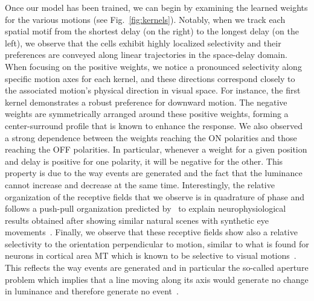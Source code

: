 \documentclass[default]{sn-jnl}%
\theoremstyle{thmstyleone}%
\theoremstyle{thmstyletwo}%
\theoremstyle{thmstylethree}%
\newcommand{\seeFig}[1]{see Fig.~\ref{fig:#1}}%
\begin{document}
%
%
Once our model has been trained, we can begin by examining the learned weights for the various motions (\seeFig{kernels}). Notably, when we track each spatial motif from the shortest delay (on the right) to the longest delay (on the left), we observe that the cells exhibit highly localized selectivity and their preferences are conveyed along linear trajectories in the space-delay domain. When focusing on the positive weights, we notice a pronounced selectivity along specific motion axes for each kernel, and these directions correspond closely to the associated motion's physical direction in visual space. For instance, the first kernel demonstrates a robust preference for downward motion. The negative weights are symmetrically arranged around these positive weights, forming a center-surround profile that is known to enhance the response. We also observed a strong dependence between the weights reaching the ON polarities and those reaching the OFF polarities. In particular, whenever a weight for a given position and delay is positive for one polarity, it will be negative for the other. This property is due to the way events are generated and the fact that the luminance cannot increase and decrease at the same time.  Interestingly, the relative organization of the receptive fields that we observe is in quadrature of phase and follows a push-pull organization predicted by~\citet{kremkow_push-pull_2016} to explain neurophysiological results obtained after showing similar natural scenes with synthetic eye movements~\citep{baudot_animation_2013}. Finally, we observe that these receptive fields show also a relative selectivity to the orientation perpendicular to motion, similar to what is found for neurons in cortical area MT which is known to be selective to visual motions~\citep{deangelis_functional_1999}. This reflects the way events are generated and in particular the so-called aperture problem which implies that a line moving along its axis would generate no change in luminance and therefore generate no event~\citep{perrinet_motion-based_2012}.
\end{document}
